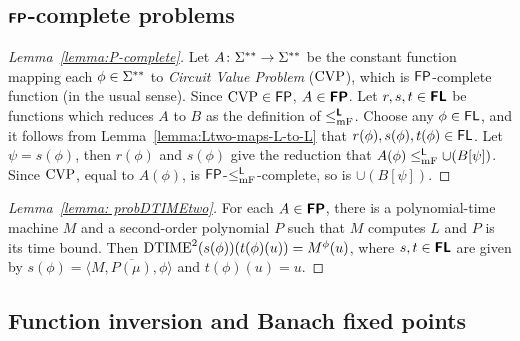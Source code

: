 \documentclass[envcountsame,orivec,oribibl]{llncs}
\begin{document}
\subsection{$\text{\bfseries \sffamily \upshape FP}$-complete problems}

\begin{proof}[Lemma~\ref{lemma:P-complete}]
Let $A \colon \Sigma ^{**} \to \Sigma ^{**}$ be the constant function mapping each $\phi \in \Sigma ^{**}$ to \emph{Circuit Value Problem} ($\mathrm{CVP}$), which is $\mathsf{FP}$-complete function (in the usual sense).
Since $\mathrm{CVP} \in \mathsf{FP}$, $A \in \text{\bfseries \sffamily \upshape FP}$.
Let $r, s, t \in \text{\bfseries \sffamily \upshape FL}$ be functions which reduces $A$ to $B$
as the definition of $\leq _{\mathrm{mF}} ^{\text{\bfseries \sffamily \upshape L}}$.
Choose any $\phi \in \mathsf{FL}$, and it follows from Lemma~\ref{lemma:Ltwo-maps-L-to-L}
that $r(\phi), s(\phi), t(\phi) \in \mathsf{FL}$.
Let $\psi = s(\phi)$, then $r(\phi)$ and $s(\phi)$ give the reduction that
$A(\phi) \leq _{\mathrm{mF}}^{\mathsf{L}} \cup (B[\psi])$.
Since $\mathrm{CVP}$, equal to $A(\phi)$, is $\mathsf{FP}$-$\leq _{\mathrm{mF}}^{\mathsf{L}}$-complete,
so is $\cup (B[\psi])$.
\end{proof}

\begin{proof}[Lemma~\ref{lemma: probDTIMEtwo}]
 For each $A \in \text{\bfseries \sffamily \upshape FP}$, 
 there is a polynomial-time machine $M$ 
 and a second-order polynomial $P$ 
 such that $M$ computes $L$ and $P$ is its time bound. 
 Then $\mathrm{DTIME}^2(s(\phi))(t(\phi)(u)) = M^\phi (u)$, 
 where 
 $s, t \in \text{\bfseries \sffamily \upshape FL}$ are given by 
 $s(\phi) = \langle M, \overline{P(\mu)}, \phi \rangle$ and 
 $t(\phi)(u) = u$.
\end{proof}

\subsection{Function inversion and Banach fixed points}
\end{document}
